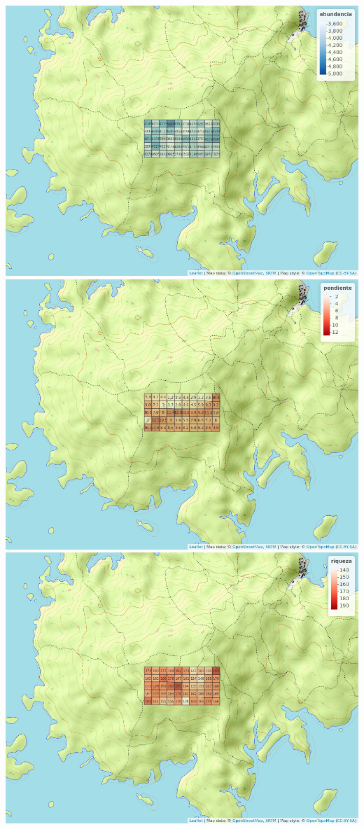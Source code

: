\documentclass[11pt,]{article}
\begin{document}
\includegraphics[width=1.00000\textwidth]{mapa_cuadros_abun_global.png}
\includegraphics[width=1.00000\textwidth]{mapa_cuadros_pendiente.png}
\includegraphics[width=1.00000\textwidth]{mapa_cuadros_riq_global.png}
\end{document}
